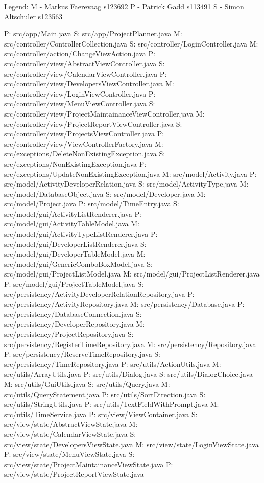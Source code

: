 Legend:
M - Markus Faerevaag s123692
P - Patrick Gadd s113491
S - Simon Altschuler s123563

P: src/app/Main.java
S: src/app/ProjectPlanner.java
M: src/controller/ControllerCollection.java
S: src/controller/LoginController.java
M: src/controller/action/ChangeViewAction.java
P: src/controller/view/AbstractViewController.java
S: src/controller/view/CalendarViewController.java
P: src/controller/view/DevelopersViewController.java
M: src/controller/view/LoginViewController.java
P: src/controller/view/MenuViewController.java
S: src/controller/view/ProjectMaintainanceViewController.java
M: src/controller/view/ProjectReportViewController.java
S: src/controller/view/ProjectsViewController.java
P: src/controller/view/ViewControllerFactory.java
M: src/exceptions/DeleteNonExistingException.java
S: src/exceptions/NonExistingException.java
P: src/exceptions/UpdateNonExistingException.java
M: src/model/Activity.java
P: src/model/ActivityDeveloperRelation.java
S: src/model/ActivityType.java
M: src/model/DatabaseObject.java
S: src/model/Developer.java
M: src/model/Project.java
P: src/model/TimeEntry.java
S: src/model/gui/ActivityListRenderer.java
P: src/model/gui/ActivityTableModel.java
M: src/model/gui/ActivityTypeListRenderer.java
P: src/model/gui/DeveloperListRenderer.java
S: src/model/gui/DeveloperTableModel.java
M: src/model/gui/GenericComboBoxModel.java
S: src/model/gui/ProjectListModel.java
M: src/model/gui/ProjectListRenderer.java
P: src/model/gui/ProjectTableModel.java
S: src/persistency/ActivityDeveloperRelationRepository.java
P: src/persistency/ActivityRepository.java
M: src/persistency/Database.java
P: src/persistency/DatabaseConnection.java
S: src/persistency/DeveloperRepository.java
M: src/persistency/ProjectRepository.java
S: src/persistency/RegisterTimeRepository.java
M: src/persistency/Repository.java
P: src/persistency/ReserveTimeRepository.java
S: src/persistency/TimeRepository.java
P: src/utils/ActionUtils.java
M: src/utils/ArrayUtils.java
P: src/utils/Dialog.java
S: src/utils/DialogChoice.java
M: src/utils/GuiUtils.java
S: src/utils/Query.java
M: src/utils/QueryStatement.java
P: src/utils/SortDirection.java
S: src/utils/StringUtils.java
P: src/utils/TextFieldWithPrompt.java
M: src/utils/TimeService.java
P: src/view/ViewContainer.java
S: src/view/state/AbstractViewState.java
M: src/view/state/CalendarViewState.java
S: src/view/state/DevelopersViewState.java
M: src/view/state/LoginViewState.java
P: src/view/state/MenuViewState.java
S: src/view/state/ProjectMaintainanceViewState.java
P: src/view/state/ProjectReportViewState.java
